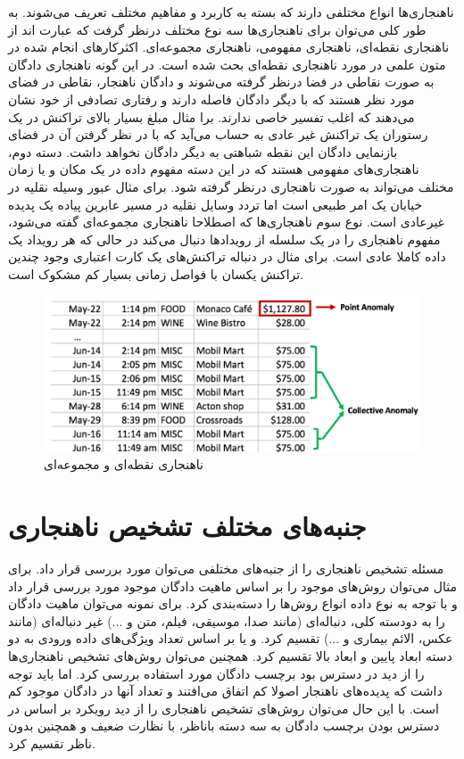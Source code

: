 \documentclass[12pt,a4paper]{report}
\theoremstyle{definition}
\theoremstyle{definition}
\begin{document}
ناهنجاری‌ها انواع مختلفی دارند که بسته به کاربرد و مفاهیم مختلف تعریف می‌شوند. به طور کلی می‌توان برای ناهنجاری‌ها سه نوع مختلف درنظر گرفت که عبارت اند از ناهنجاری نقطه‌ای،‌ ناهنجاری مفهومی‌،‌ ناهنجاری مجموعه‌ای. اکثرکارهای انجام شده در متون علمی در مورد ناهنجاری نقطه‌ای بحث شده است. در این گونه ناهنجاری دادگان به صورت نقاطی در فضا درنظر گرفته می‌شوند و دادگان ناهنجار، نقاطی در فضای مورد نظر هستند که با دیگر دادگان فاصله دارند و رفتاری تصادفی از خود نشان می‌دهند که اغلب تفسیر خاصی ندارند. برا مثال مبلغ بسیار بالای تراکنش در یک رستوران  یک تراکنش غیر عادی به حساب می‌آید که با در نظر گرفتن آن در فضای بازنمایی دادگان این نقطه شباهتی به دیگر دادگان نخواهد داشت. دسته دوم، ناهنجاری‌های مفهومی هستند که در این دسته مفهوم داده در یک مکان‌ و یا زمان‌ مختلف می‌تواند به صورت ناهنجاری درنظر گرفته شود. برای مثال عبور وسیله نقلیه در خیابان یک امر طبیعی است اما تردد وسایل نقلیه در مسیر عابرین پیاده یک پدیده غیرعادی است. نوع سوم ناهنجاری‌ها که اصطلاحا ناهنجاری مجموعه‌ای گفته می‌شود،‌ مفهوم ناهنجاری را در یک سلسله از رویدادها دنبال می‌کند در حالی که هر رویداد یک داده کاملا عادی است. برای مثال در دنباله تراکنش‌های یک کارت اعتباری وجود چندین تراکنش یکسان با فواصل زمانی بسیار کم مشکوک است.

\begin{figure}[!hp]
	\begin{center}
		\includegraphics[width=0.7\linewidth]{./images/figures/credit-card.png}

		\caption{
		ناهنجاری نقطه‌ای و مجموعه‌ای
		\cite{G.Chalapathy}
		}		
		\label{fig:anomaly-example-1}
		\centering
	\end{center}
\end{figure}

\section{جنبه‌های مختلف تشخیص ناهنجاری}
مسئله تشخیص ناهنجاری را از جنبه‌های مختلفی می‌توان مورد بررسی قرار داد. برای مثال می‌توان روش‌های موجود را بر اساس ماهیت دادگان موجود مورد بررسی قرار داد و با توجه به نوع داده انواع روش‌ها را دسته‌بندی کرد. برای نمونه می‌توان ماهیت دادگان را به دودسته کلی، دنباله‌ای (مانند صدا، موسیقی، فیلم، متن و ...) غیر دنباله‌ای (مانند عکس، الائم بیماری و ...) تقسیم کرد. و یا بر اساس تعداد ویژگی‌های داده ورودی به دو دسته ابعاد پایین و ابعاد بالا تقسیم کرد. همچنین می‌توان روش‌های تشخیص ناهنجاری‌ها را از دید در دسترس بود برچسب دادگان مورد استفاده بررسی کرد. اما باید توجه داشت که پدیده‌های ناهنجار اصولا کم اتفاق می‌افتند و تعداد آنها در دادگان موجود کم است. با این حال می‌توان روش‌های تشخیص ناهنجاری را از دید رویکرد بر اساس در دسترس بودن برچسب دادگان به سه دسته باناظر، با نظارت ضعیف و همچنین بدون ناظر تقسیم کرد.
\end{document}
